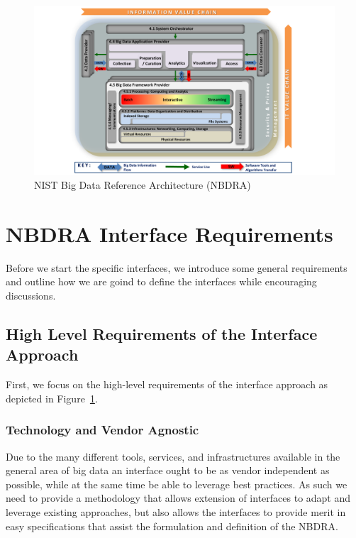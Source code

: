 \documentclass[10pt]{article}
\begin{document}
\begin{figure}[h]\centering
\includegraphics[width=1.1\textwidth]{images/vol8-diagrams}
\caption{NIST Big Data Reference Architecture (NBDRA)}
\label{F:architecture}
\end{figure}


\section{NBDRA Interface Requirements}

Before we start the specific interfaces, we introduce some general requirements and outline how we are goind to define the interfaces while encouraging discussions. 

\subsection{High Level Requirements of the Interface Approach}

First, we focus on the high-level requirements of the interface approach as depicted in Figure~\ref{F:architecture}.

\subsubsection{Technology and Vendor Agnostic}

Due to the many different tools, services, and infrastructures available in the general area of big data an interface ought to be as vendor independent as possible, while at the same time be able to leverage best practices. As such we need to provide a methodology that allows extension of interfaces to adapt and leverage existing approaches, but also allows the interfaces to provide merit in easy specifications that assist the formulation and definition of the NBDRA. 
\end{document}
